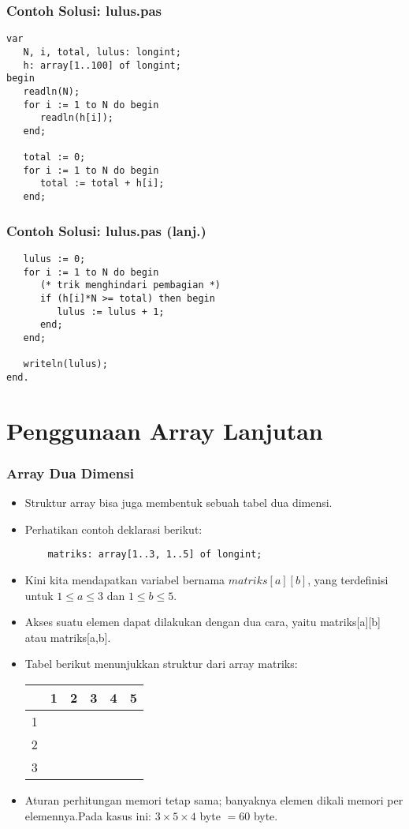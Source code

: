 \documentclass{beamer}
\begin{document}
\begin{frame}[fragile]
\frametitle{Contoh Solusi: lulus.pas}
\begin{lstlisting}
var
   N, i, total, lulus: longint;
   h: array[1..100] of longint;
begin
   readln(N);
   for i := 1 to N do begin
      readln(h[i]);
   end;

   total := 0;
   for i := 1 to N do begin
      total := total + h[i];
   end;
\end{lstlisting}
\end{frame}

\begin{frame}[fragile]
\frametitle{Contoh Solusi: lulus.pas (lanj.)}
\begin{lstlisting}
   lulus := 0;
   for i := 1 to N do begin
      (* trik menghindari pembagian *)
      if (h[i]*N >= total) then begin 
         lulus := lulus + 1;
      end;
   end;

   writeln(lulus);
end.
\end{lstlisting}
\end{frame}

\section{Penggunaan Array Lanjutan}
\frame{\sectionpage}

\begin{frame}[fragile]
\frametitle{Array Dua Dimensi}
\begin{itemize}
	\item Struktur array bisa juga membentuk sebuah tabel dua dimensi.
	\item Perhatikan contoh deklarasi berikut:
	\begin{lstlisting}
	matriks: array[1..3, 1..5] of longint;
	\end{lstlisting}
	\item Kini kita mendapatkan variabel bernama $matriks[a][b]$, yang terdefinisi untuk $1 \le a \le 3$ dan $1 \le b \le 5$.
	\item Akses suatu elemen dapat dilakukan dengan dua cara, yaitu matriks[a][b] atau matriks[a,b].
	\item Tabel berikut menunjukkan struktur dari array matriks:
	\begin{table}[h]
		\begin{tabular}{c|c|c|c|c|c|}
			  & 1 & 2 & 3 & 4 & 5\\ 
			\hline 1 & & & & & \\ 
			\hline 2 & & & & & \\ 
			\hline 3 & & & & & \\ 			
			\hline
		\end{tabular}
	\end{table}  
	\item Aturan perhitungan memori tetap sama; banyaknya elemen dikali memori per elemennya.\newline Pada kasus ini: $3 \times 5 \times 4$ byte $= 60$ byte.
\end{itemize}
\end{frame}
\end{document}

